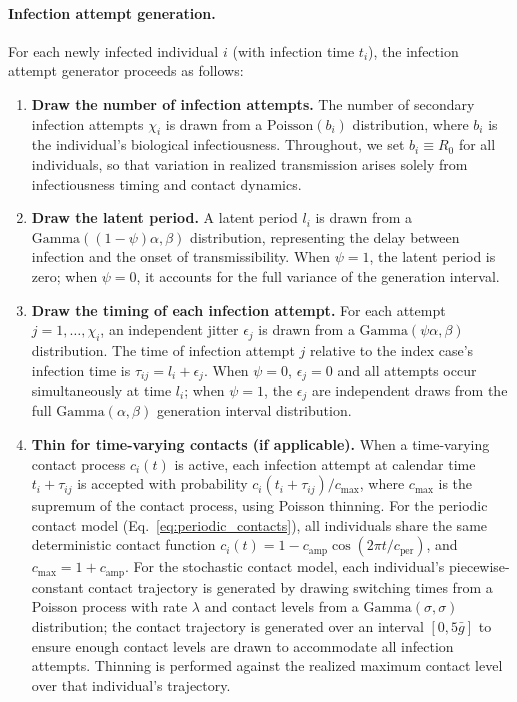 \paragraph{Infection attempt generation.}
For each newly infected individual $i$ (with infection time $t_i$), the infection attempt generator proceeds as follows:
\begin{enumerate}
	\item \textbf{Draw the number of infection attempts.} The number of secondary infection attempts $\chi_i$ is drawn from a $\text{Poisson}(b_i)$ distribution, where $b_i$ is the individual's biological infectiousness. Throughout, we set $b_i \equiv R_0$ for all individuals, so that variation in realized transmission arises solely from infectiousness timing and contact dynamics.
	\item \textbf{Draw the latent period.} A latent period $l_i$ is drawn from a $\text{Gamma}((1-\psi)\alpha, \beta)$ distribution, representing the delay between infection and the onset of transmissibility. When $\psi = 1$, the latent period is zero; when $\psi = 0$, it accounts for the full variance of the generation interval.
	\item \textbf{Draw the timing of each infection attempt.} For each attempt $j = 1, \ldots, \chi_i$, an independent jitter $\epsilon_j$ is drawn from a $\text{Gamma}(\psi\alpha, \beta)$ distribution. The time of infection attempt $j$ relative to the index case's infection time is $\tau_{ij} = l_i + \epsilon_j$. When $\psi = 0$, $\epsilon_j = 0$ and all attempts occur simultaneously at time $l_i$; when $\psi = 1$, the $\epsilon_j$ are independent draws from the full $\text{Gamma}(\alpha, \beta)$ generation interval distribution.
	\item \textbf{Thin for time-varying contacts (if applicable).} When a time-varying contact process $c_i(t)$ is active, each infection attempt at calendar time $t_i + \tau_{ij}$ is accepted with probability $c_i(t_i + \tau_{ij}) / c_{\max}$, where $c_{\max}$ is the supremum of the contact process, using Poisson thinning. For the periodic contact model (Eq.~\ref{eq:periodic_contacts}), all individuals share the same deterministic contact function $c_i(t) = 1 - c_{\text{amp}} \cos(2\pi t / c_{\text{per}})$, and $c_{\max} = 1 + c_{\text{amp}}$. For the stochastic contact model, each individual's piecewise-constant contact trajectory is generated by drawing switching times from a Poisson process with rate $\lambda$ and contact levels from a $\text{Gamma}(\sigma, \sigma)$ distribution; the contact trajectory is generated over an interval $[0, 5\bar{g}]$ to ensure enough contact levels are drawn to accommodate all infection attempts. Thinning is performed against the realized maximum contact level over that individual's trajectory.

\end{enumerate}
